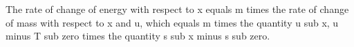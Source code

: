 The rate of change of energy with respect to x equals m times the rate of change of mass with respect to x and u, which equals m times the quantity u sub x, u minus T sub zero times the quantity s sub x minus s sub zero.